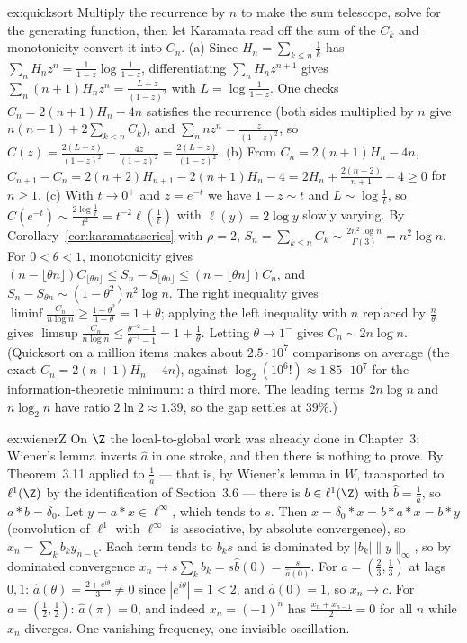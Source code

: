 \begin{solution}{ex:quicksort}
\idea Multiply the recurrence by $n$ to make the sum telescope, solve for the generating function, then let Karamata read off the sum of the $C_k$ and
monotonicity convert it into $C_n$.
\writeup (a) Since $H_n=\sum_{k\le n}\frac1k$ has $\sum_nH_nz^n=\frac1{1-z}\log\frac1{1-z}$, differentiating $\sum_nH_nz^{n+1}$ gives
$\sum_n(n+1)H_nz^n=\frac{L+z}{(1-z)^2}$ with $L=\log\frac1{1-z}$. One checks $C_n=2(n+1)H_n-4n$ satisfies the recurrence (both sides multiplied by $n$ give
$n(n-1)+2\sum_{k<n}C_k$), and $\sum_nnz^n=\frac z{(1-z)^2}$, so $C(z)=\frac{2(L+z)}{(1-z)^2}-\frac{4z}{(1-z)^2}=\frac{2(L-z)}{(1-z)^2}$. (b) From
$C_n=2(n+1)H_n-4n$, $C_{n+1}-C_n=2(n+2)H_{n+1}-2(n+1)H_n-4=2H_n+\frac{2(n+2)}{n+1}-4\ge0$ for $n\ge1$. (c) With $t\to0^+$ and $z=e^{-t}$ we have $1-z\sim t$ and
$L\sim\log\frac1t$, so $C(e^{-t})\sim\frac{2\log\frac1t}{t^2}=t^{-2}\ell(\frac1t)$ with $\ell(y)=2\log y$ slowly varying. By
Corollary~\ref{cor:karamataseries} with $\rho=2$, $S_n=\sum_{k\le n}C_k\sim\frac{2n^2\log n}{\Gamma(3)}=n^2\log n$. For $0<\theta<1$, monotonicity gives
$(n-\lfloor\theta n\rfloor)C_{\lfloor\theta n\rfloor}\le S_n-S_{\lfloor\theta n\rfloor}\le(n-\lfloor\theta n\rfloor)C_n$, and $S_n-S_{\theta n}\sim(1-\theta^2)n^2\log n$. The right
inequality gives $\liminf\frac{C_n}{n\log n}\ge\frac{1-\theta^2}{1-\theta}=1+\theta$; applying the left inequality with $n$ replaced by $\frac n\theta$ gives
$\limsup\frac{C_n}{n\log n}\le\frac{\theta^{-2}-1}{\theta^{-1}-1}=1+\frac1\theta$. Letting $\theta\to1^-$ gives $C_n\sim2n\log n$. (Quicksort on a million items makes about $2.5\cdot10^7$ comparisons on average (the exact $C_n=2(n+1)H_n-4n$), against
$\log_2(10^6!)\approx1.85\cdot10^7$ for the information-theoretic minimum: a third more. The leading terms $2n\log n$ and $n\log_2n$ have
ratio $2\ln2\approx1.39$, so the gap settles at $39\%$.)
\end{solution}

\begin{solution}{ex:wienerZ}
\idea On $\Z$ the local-to-global work was already done in Chapter~3: Wiener's lemma inverts $\hat a$ in one stroke, and then there is nothing to prove.
\writeup By Theorem~3.11 applied to $\frac1{\hat a}$ --- that is, by Wiener's lemma in $W$, transported to $\ell^1(\Z)$ by the identification of
Section~3.6 --- there is $b\in\ell^1(\Z)$ with $\hat b=\frac1{\hat a}$, so $a*b=\delta_0$. Let $y=a*x\in\ell^\infty$, which tends to $s$. Then
$x=\delta_0*x=b*a*x=b*y$ (convolution of $\ell^1$ with $\ell^\infty$ is associative, by absolute convergence), so $x_n=\sum_kb_ky_{n-k}$. Each term tends to
$b_ks$ and is dominated by $|b_k|\|y\|_\infty$, so by dominated convergence $x_n\to s\sum_kb_k=s\hat b(0)=\frac s{\hat a(0)}$. For
$a=(\frac23,\frac13)$ at lags $0,1$: $\hat a(\theta)=\frac{2+e^{i\theta}}3\ne0$ since $|e^{i\theta}|=1<2$, and $\hat a(0)=1$, so $x_n\to c$. For
$a=(\frac12,\frac12)$: $\hat a(\pi)=0$, and indeed $x_n=(-1)^n$ has $\frac{x_n+x_{n-1}}2=0$ for all $n$ while $x_n$ diverges. One vanishing frequency, one
invisible oscillation.
\end{solution}

